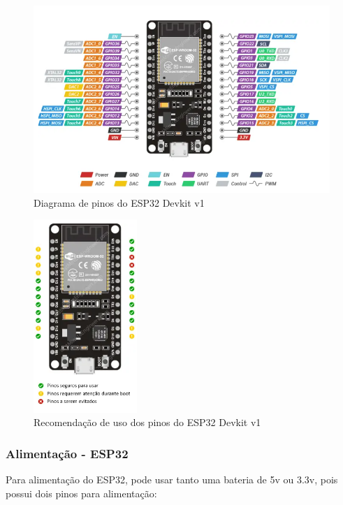 \begin{figure}[htb]
	\centering
	\includegraphics[width=1.0\textwidth]{figures/esp32_pinout}
	\caption{Diagrama de pinos do ESP32 Devkit v1 \cite{esp32_reference}}
\end{figure}


\begin{figure}[htb]
	\centering
	\includegraphics[width=0.35\textwidth]{figures/esp32_pinout_ref}
	\caption{Recomendação de uso dos pinos do ESP32 Devkit v1 \cite{esp32_reference}}
\end{figure}






\subsubsection{Alimentação - ESP32}

Para alimentação do ESP32, pode usar tanto uma bateria de 5v ou 3.3v, pois possui dois pinos para alimentação: 

